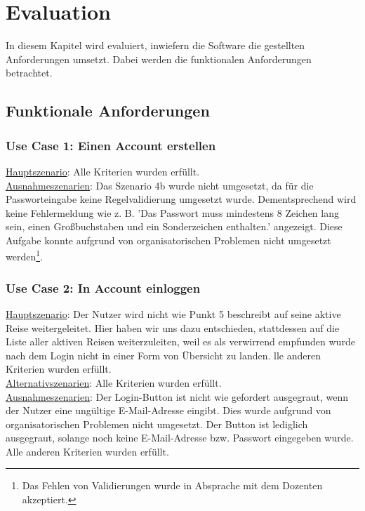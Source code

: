 \section{Evaluation}
In diesem Kapitel wird evaluiert, inwiefern die Software die gestellten Anforderungen umsetzt. Dabei werden die funktionalen Anforderungen betrachtet.

\subsection{Funktionale Anforderungen}

\subsubsection*{Use Case 1: Einen Account erstellen}
\begin{addmargin}{10pt}
\underline{Hauptszenario}: Alle Kriterien wurden erfüllt.\\
\underline{Ausnahmeszenarien}: Das Szenario 4b wurde nicht umgesetzt, da für die Passworteingabe keine Regelvalidierung umgesetzt wurde. 
Dementsprechend wird keine Fehlermeldung wie z. B. 'Das Passwort muss mindestens 8 Zeichen lang sein, einen Großbuchstaben und ein Sonderzeichen enthalten.' angezeigt. 
Diese Aufgabe konnte aufgrund von organisatorischen Problemen nicht umgesetzt werden\footnote{Das Fehlen von Validierungen wurde in Absprache mit dem Dozenten akzeptiert.}.
\end{addmargin}

\subsubsection*{Use Case 2: In Account einloggen}

\begin{addmargin}{10pt}
\underline{Hauptszenario}: Der Nutzer wird nicht wie Punkt 5 beschreibt auf seine aktive Reise weitergeleitet. 
Hier haben wir uns dazu entschieden, stattdessen auf die Liste aller aktiven Reisen weiterzuleiten, weil es als verwirrend empfunden wurde nach dem Login nicht in einer Form von Übersicht zu landen. 
lle anderen Kriterien wurden erfüllt.\\
\underline{Alternativszenarien}: Alle Kriterien wurden erfüllt.\\
\underline{Ausnahmeszenarien}: Der Login-Button ist nicht wie gefordert ausgegraut, wenn der Nutzer eine ungültige E-Mail-Adresse eingibt. 
Dies wurde aufgrund von organisatorischen Problemen nicht umgesetzt.
Der Button ist lediglich ausgegraut, solange noch keine E-Mail-Adresse bzw. Passwort eingegeben wurde. 
Alle anderen Kriterien wurden erfüllt.
\end{addmargin}

